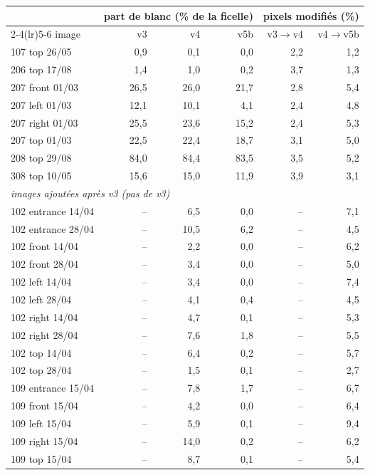 \begin{tabular}{l rrr rr}
\toprule
 & \multicolumn{3}{c}{part de blanc (\% de la ficelle)} & \multicolumn{2}{c}{pixels modifiés (\%)} \\
\cmidrule(lr){2-4}\cmidrule(lr){5-6}
image & v3 & v4 & v5b & v3$\to$v4 & v4$\to$v5b \\
\midrule
107 top 26/05 & 0{,}9 & 0{,}1 & 0{,}0 & 2{,}2 & 1{,}2 \\
206 top 17/08 & 1{,}4 & 1{,}0 & 0{,}2 & 3{,}7 & 1{,}3 \\
207 front 01/03 & 26{,}5 & 26{,}0 & 21{,}7 & 2{,}8 & 5{,}4 \\
207 left 01/03 & 12{,}1 & 10{,}1 & 4{,}1 & 2{,}4 & 4{,}8 \\
207 right 01/03 & 25{,}5 & 23{,}6 & 15{,}2 & 2{,}4 & 5{,}3 \\
207 top 01/03 & 22{,}5 & 22{,}4 & 18{,}7 & 3{,}1 & 5{,}0 \\
208 top 29/08 & 84{,}0 & 84{,}4 & 83{,}5 & 3{,}5 & 5{,}2 \\
308 top 10/05 & 15{,}6 & 15{,}0 & 11{,}9 & 3{,}9 & 3{,}1 \\
\midrule \multicolumn{6}{l}{\textit{images ajoutées après v3 (pas de v3)}} \\
102 entrance 14/04 & -- & 6{,}5 & 0{,}0 & -- & 7{,}1 \\
102 entrance 28/04 & -- & 10{,}5 & 6{,}2 & -- & 4{,}5 \\
102 front 14/04 & -- & 2{,}2 & 0{,}0 & -- & 6{,}2 \\
102 front 28/04 & -- & 3{,}4 & 0{,}0 & -- & 5{,}0 \\
102 left 14/04 & -- & 3{,}4 & 0{,}0 & -- & 7{,}4 \\
102 left 28/04 & -- & 4{,}1 & 0{,}4 & -- & 4{,}5 \\
102 right 14/04 & -- & 4{,}7 & 0{,}1 & -- & 5{,}3 \\
102 right 28/04 & -- & 7{,}6 & 1{,}8 & -- & 5{,}5 \\
102 top 14/04 & -- & 6{,}4 & 0{,}2 & -- & 5{,}7 \\
102 top 28/04 & -- & 1{,}5 & 0{,}1 & -- & 2{,}7 \\
109 entrance 15/04 & -- & 7{,}8 & 1{,}7 & -- & 6{,}7 \\
109 front 15/04 & -- & 4{,}2 & 0{,}0 & -- & 6{,}4 \\
109 left 15/04 & -- & 5{,}9 & 0{,}1 & -- & 9{,}4 \\
109 right 15/04 & -- & 14{,}0 & 0{,}2 & -- & 6{,}2 \\
109 top 15/04 & -- & 8{,}7 & 0{,}1 & -- & 5{,}4 \\

\end{tabular}
